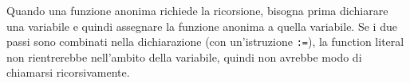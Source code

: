 \documentclass[../../thesis.tex]{subfiles}
\begin{document}
    Quando una funzione anonima richiede la ricorsione, bisogna prima dichiarare una variabile e quindi assegnare la funzione anonima a quella variabile.
    Se i due passi sono combinati nella dichiarazione (con un'istruzione \verb":="), la function literal non rientrerebbe nell'ambito della variabile, quindi non avrebbe modo di chiamarsi ricorsivamente.
\end{document}
